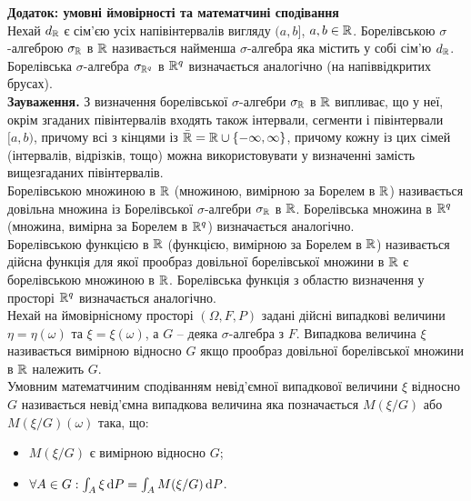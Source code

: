 \textbf{Додаток: умовні ймовірності та математчині сподівання} \\

Нехай $d_{\mathbb{R}}$ є сім'єю усіх напівінтервалів вигляду $(a, b]$, $a, b \in \mathbb{R}$. Борелівською $\sigma$-алгеброю $\sigma_{\mathbb{R}}$ в $\mathbb{R}$ називається найменша $\sigma$-алгебра яка містить у собі сім'ю $d_{\mathbb{R}}$. Борелівська $\sigma$-алгебра $\sigma_{\mathbb{R}^q}$ в $\mathbb{R}^q$ визначається аналогічно (на напіввідкритих брусах). \\

\textbf{Зауваження.} З визначення борелівської $\sigma$-алгебри $\sigma_{\mathbb{R}}$ в $\mathbb{R}$ випливає, що у неї, окрім згаданих півінтервалів входять також інтервали, сегменти і півінтервали $[a, b)$, причому всі з кінцями із $\bar{\mathbb{R}} = \mathbb{R} \cup \{ -\infty, \infty \}$, причому кожну із цих сімей (інтервалів, відрізків, тощо) можна використовувати у визначенні замість вищезгаданих півінтервалів. \\

Борелівською множиною в $\mathbb{R}$ (множиною, вимірною за Борелем в $\mathbb{R}$) називається довільна множина із Борелівської $\sigma$-алгебри $\sigma_{\mathbb{R}}$ в $\mathbb{R}$. Борелівська множина в $\mathbb{R}^q$ (множина, вимірна за Борелем в $\mathbb{R}^q$) визначається аналогічно.\\

Борелівською функцією в $\mathbb{R}$ (функцією, вимірною за Борелем в $\mathbb{R}$) називається дійсна функція для якої прообраз довільної борелівської множини в $\mathbb{R}$ є борелівською множиною в $\mathbb{R}$. Борелівська функція з областю визначення у просторі $\mathbb{R}^q$ визначається аналогічно. \\

Нехай на ймовірнісному просторі $(\Omega, F, P)$ задані дійсні випадкові величини $\eta = \eta(\omega)$ та $\xi = \xi(\omega)$, а $G$ -- деяка $\sigma$-алгебра з $F$. Випадкова величина $\xi$ називається вимірною відносно $G$ якщо прообраз довільної борелівської множини в $\mathbb{R}$ належить $G$. \\

Умовним математчиним сподіванням невід'ємної випадкової величини $\xi$ відносно $G$ називається невід'ємна випадкова величина яка позначається $M(\xi / G)$ або $M(\xi / G)(\omega)$ така, що:
\begin{itemize}
    \item $M(\xi / G)$ є вимірною відносно $G$;
    \item $\forall A \in G: \int_A \xi \mathop{}\!\mathrm{d} P = \int_A M(\xi / G) \mathop{}\!\mathrm{d} P$.
\end{itemize}

